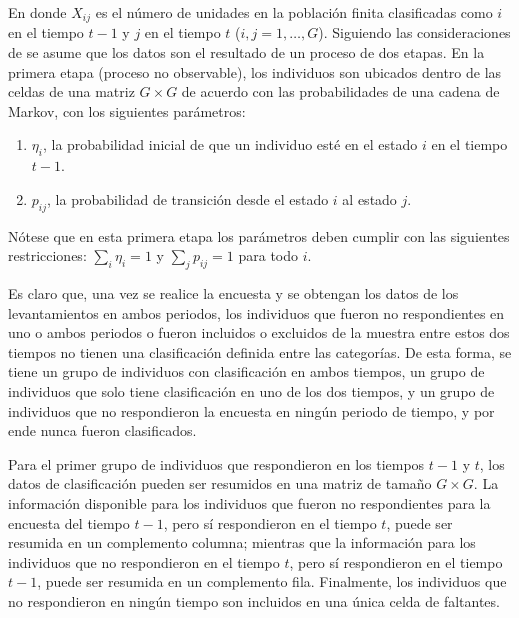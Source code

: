 \documentclass[
  12pt,
]{book}
\providecommand{\tightlist}{%
  \setlength{\itemsep}{0pt}\setlength{\parskip}{0pt}}
\begin{document}
En donde \(X_{ij}\) es el número de unidades en la población finita clasificadas como \(i\) en el tiempo \(t-1\) y \(j\) en el tiempo \(t\) (\(i,j=1,\ldots, G\)). Siguiendo las consideraciones de \citet{Feinberg_Stasny_1983} se asume que los datos son el resultado de un proceso de dos etapas. En la primera etapa (proceso no observable), los individuos son ubicados dentro de las celdas de una matriz \(G\times G\) de acuerdo con las probabilidades de una cadena de Markov, con los siguientes parámetros:

\begin{enumerate}
\def\labelenumi{\arabic{enumi}.}
\tightlist
\item
  \(\eta_i\), la probabilidad inicial de que un individuo esté en el estado \(i\) en el tiempo \(t-1\).
\item
  \(p_{ij}\), la probabilidad de transición desde el estado \(i\) al estado \(j\).
\end{enumerate}

Nótese que en esta primera etapa los parámetros deben cumplir con las siguientes restricciones: \(\sum_i\eta_i=1\) y \(\sum_jp_{ij}=1\) para todo \(i\).

Es claro que, una vez se realice la encuesta y se obtengan los datos de los levantamientos en ambos periodos, los individuos que fueron no respondientes en uno o ambos periodos o fueron incluidos o excluidos de la muestra entre estos dos tiempos no tienen una clasificación definida entre las categorías. De esta forma, se tiene un grupo de individuos con clasificación en ambos tiempos, un grupo de individuos que solo tiene clasificación en uno de los dos tiempos, y un grupo de individuos que no respondieron la encuesta en ningún periodo de tiempo, y por ende nunca fueron clasificados.

Para el primer grupo de individuos que respondieron en los tiempos \(t-1\) y \(t\), los datos de clasificación pueden ser resumidos en una matriz de tamaño \(G\times G\). La información disponible para los individuos que fueron no respondientes para la encuesta del tiempo \(t-1\), pero sí respondieron en el tiempo \(t\), puede ser resumida en un complemento columna; mientras que la información para los individuos que no respondieron en el tiempo \(t\), pero sí respondieron en el tiempo \(t-1\), puede ser resumida en un complemento fila. Finalmente, los individuos que no respondieron en ningún tiempo son incluidos en una única celda de faltantes.
\end{document}
